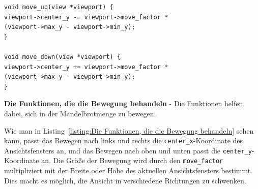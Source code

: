 \documentclass[ngerman,12pt,a4paper,titlepage]{article}
\begin{document}
\begin{sloppypar}
\begin{listing}[H]
\begin{verbatim}
void move_up(view *viewport) {
viewport->center_y -= viewport->move_factor *
(viewport->max_y - viewport->min_y);
}
	
void move_down(view *viewport) {
viewport->center_y += viewport->move_factor *
(viewport->max_y - viewport->min_y);
}
	\end{verbatim}
	\caption[\textbf{Die Funktionen, die die Bewegung behandeln}]{\textbf{Die Funktionen, die die Bewegung behandeln} - Die Funktionen helfen dabei, sich in der Mandelbrotmenge zu bewegen.}
	\label{listing:Die Funktionen, die die Bewegung behandeln}
\end{listing}
Wie man in Listing~\ref{listing:Die Funktionen, die die Bewegung behandeln} sehen kann, passt das Bewegen nach links und rechts die \texttt{center\_x}-Koordinate des Ansichtsfensters an, und das Bewegen nach oben und unten passt die \texttt{center\_y}-Koordinate an. Die Größe der Bewegung wird durch den \texttt{move\_factor} multipliziert mit der Breite oder Höhe des aktuellen Ansichtsfensters bestimmt. Dies macht es möglich, die Ansicht in verschiedene Richtungen zu schwenken.

\end{sloppypar}
\end{document}
